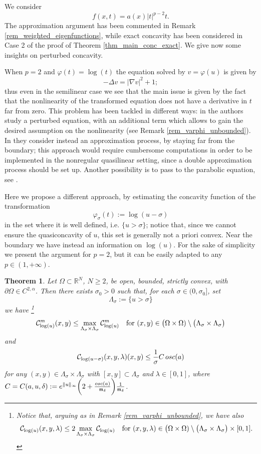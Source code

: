 \documentclass[11pt, reqno]{amsart}
\newtheorem{theorem}[lemma]{Theorem}
\theoremstyle{definition}
\numberwithin{equation}{section}
\newcommand{\R}{\mathbb{R}}
\newcommand{\mc}[1]{\mathcal{#1}}
\newcommand{\osc}{{\rm osc}}
\def\norm#1{\|#1\|}
\begin{document}
We consider 
$$f(x,t) = a(x) |t|^{p-2} t.$$
The approximation argument has been commented in Remark \ref{rem_weighted_eigenfunctions}, while exact concavity has been considered in Case 2 of the proof of Theorem \ref{thm_main_conc_exact}. 
We give now some insights on perturbed concavity.

When $p=2$ and $\varphi(t)=\log(t)$ the equation solved by $v=\varphi(u)$ is given by
$$-\Delta v = |\nabla v|^2 + 1;$$
thus even in the semilinear case we see that the main issue is given by the fact that the nonlinearity of the transformed equation does not have a derivative in $t$ far from zero.
This problem has been tackled in different ways: in \cite[Proposition 3.4]{ABCS23} the authors study a perturbed equation, with an additional term which allows to gain the desired assumption on the nonlinearity (see Remark \ref{rem_varphi_unbounded}).
In \cite[Proposition 2.8]{BuSq20} they consider instead an approximation process, by staying far from the boundary; this approach would require cumbersome computations in order to be implemented in the nonregular quasilinear setting, since a double approximation process should be set up.
Another possibility is to pass to the parabolic equation, see \cite{GMrS25}.

\medskip

Here we propose a different approach, by estimating the concavity function of the transformation 
$$\varphi_{\sigma}(t) :=\log(u-\sigma)$$
in the set where it is well defined, i.e. $\{u>\sigma\}$; notice that, since we cannot ensure the quasiconcavity of $u$, this set is generally not a priori convex. 
Near the boundary we have instead an information on $\log(u)$.
For the sake of simplicity we present the argument for $p=2$, but it can be easily adapted to any $p \in (1,+\infty)$.

\begin{theorem}
\label{thm_weigh_eigen_sigma}
Let $\Omega \subset \R^N$, $N\geq 2$, be open, bounded, strictly convex, with $\partial \Omega \in C^{2,\alpha}$. 
Then there exists $\sigma_0>0$ such that, for each $\sigma \in (0,\sigma_0]$, set 
$$\Lambda_{\sigma} :=\{u> \sigma\}$$
we have%
\footnote{Notice that, arguing as in Remark \ref{rem_varphi_unbounded}, we have also 
$$\mc{C}_{\log(u)}(x,y,\lambda) \leq 2\max_{\Lambda_{\sigma}\times \Lambda_{\sigma}} \mc{C}_{\log(u)} \quad \hbox{for $(x, y,\lambda) \in \big(\Omega \times \Omega) \setminus\big(\Lambda_{\sigma} \times \Lambda_{\sigma}\big) \times [0,1].
$}$$}
$$\mc{C}_{\log(u)}^m(x,y) \leq \max_{\Lambda_{\sigma}\times \Lambda_{\sigma}} \mc{C}^m_{\log(u)} \quad \hbox{for $(x, y) \in \big(\Omega \times \Omega) \setminus\big(\Lambda_{\sigma} \times \Lambda_{\sigma}\big)$}$$
and
$$\mc{C}_{\log(u-\sigma)}(x,y,\lambda) (x,y) \leq \frac{1}{\sigma} 
C \, \osc(a) $$
for any $(x,y) \in \Lambda_{\sigma}\times \Lambda_{\sigma}$ with $[x,y] \subset \Lambda_{\sigma}$ and $\lambda \in [0,1]$, where 
$C=C(a,u,\delta) := e^{\norm{u}_{\infty}} \bigg( 2 + \frac{\osc(a)}{\mathfrak{m}_{\delta}}\bigg) \frac{1}{\mathfrak{m}_{\delta}}$.
\end{theorem}
\end{document}
